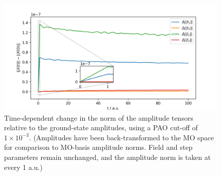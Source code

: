\begin{figure}
\centering
    \includegraphics[scale=0.6]{p3/figures/si/pao_norm.png}
    \caption{Time-dependent change in the norm of the amplitude
    tensors relative to the ground-state amplitudes, using a PAO
    cut-off of $1\times10^{-3}$. (Amplitudes have been 
    back-transformed to the MO space for comparison to MO-basis
    amplitude norms. Field and step parameters remain unchanged,
    and the amplitude norm is taken at every 1 a.u.)}
    \label{fig:si:pao_norm}
\end{figure}
